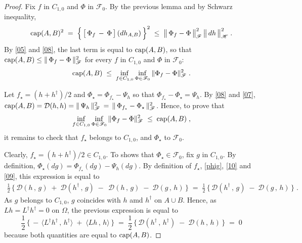\documentclass[reqno]{amsart}
\newcounter{as}[section]
\newcommand{\mc}[1]{{\mathcal #1}}
\newcommand{\ms}[1]{{\mathscr #1}}
\newcommand{\<}{\langle}
\renewcommand{\>}{\rangle}
\renewcommand{\Cap}{{\rm cap}}
\begin{document}
\begin{proof}
Fix $f$ in $C_{1,0}$ and $\Phi$ in $\ms F_0$. By the previous lemma
and by Schwarz inequality,
\begin{equation*}
\Cap(A,B)^2 \; =\; \Big\{\, \big[\, \Phi_f \,-\, \Phi\, \big] \,
(dh_{A,B}) \,\Big\}^2
\;\le\; \big\Vert\, \Phi_f - \Phi \, \big\Vert_{\ms F}^2 \,
\big\Vert\, dh \, \big\Vert_{\ms H}^2 \;.
\end{equation*}
By \eqref{05} and \eqref{08}, the last term is equal to $\Cap(A,B)$,
so that $\Cap(A,B)\le \Vert\, \Phi_f- \Phi \,\Vert_{\ms F}^2$ for
every $f$ in $C_{1,0}$ and $\Phi$ in $\ms F_0$:
\begin{equation*}
\Cap(A,B) \;\le\; \inf_{f\in C_{1,0}} \inf_{\Phi\in \ms F_0} 
\|\Phi_f-\Phi\|_{\ms F}^2 \;.
\end{equation*}

Let $f_\star = (h + h^\dagger)/2$ and $\Phi_\star = \Phi_{f_\star} -
\Psi_h$ so that $\Phi_{f_\star} - \Phi_\star = \Psi_h$. By \eqref{08}
and \eqref{07}, $\Cap(A,B)= \mc D(h,h) = \Vert\, \Psi_{h} \,\Vert_{\ms
  F}^2 \,=\, \Vert\, \Phi_{f_\star} - \Phi_\star \,\Vert_{\ms F}^2$. Hence, to prove that
\begin{equation*}
\inf_{f\in C_{1,0}} \inf_{\Phi\in \ms F_0} 
\|\Phi_f-\Phi\|_{\ms F}^2 \;\le\; \Cap(A,B) \;,
\end{equation*}
it remains to check that $f_\star$ belongs to $C_{1,0}$, and
$\Phi_\star$ to $\ms F_0$. 

Clearly, $f_\star = (h + h^\dagger)/2 \in C_{1,0}$. To shows that
$\Phi_\star \in \ms F_0$, fix $g$ in $C_{1,0}$. By definition,
$\Phi_\star (dg) = \Phi_{f_\star} (dg) - \Psi_h (dg)$. By definition
of $f_\star$, \eqref{phig}, \eqref{10} and \eqref{09}, this expression
is equal to
\begin{align*}
\frac 12 \, \Big\{\, \mc D (h\,,\, g) \;+\; 
\mc D (h^\dagger\,,\, g) \;-\; \, \mc D(h \,,\, g) \;-\; 
\mc D(g \,,\, h)\, \Big\} \;=\;
\frac 12 \, \big\{\, \mc D (h^\dagger\,,\, g) \;-\; 
\mc D(g \,,\, h)\, \big\} \;. 
\end{align*}
As $g$ belongs to $C_{1,0}$, $g$ coincides with $h$ amd $h^\dagger$ on
$A\cup B$. Hence, as $Lh = L^\dagger h^\dagger = 0$ on $\Omega$, the
previous expression is equal to
\begin{equation*}
\frac 12 \, \big\{\, -\, \< L^\dagger h^\dagger\,,\, h^\dagger \> \;+\; 
 \< L h \,,\, h \> \, \big\}
\;=\; \frac 12 \, \big\{\, \mc D (h^\dagger\,,\, h^\dagger) \;-\; 
\mc D(h \,,\, h)\, \big\} \;=\; 0
\end{equation*}
because both quantities are equal to $\Cap (A,B)$. 
\end{proof}
\end{document}
